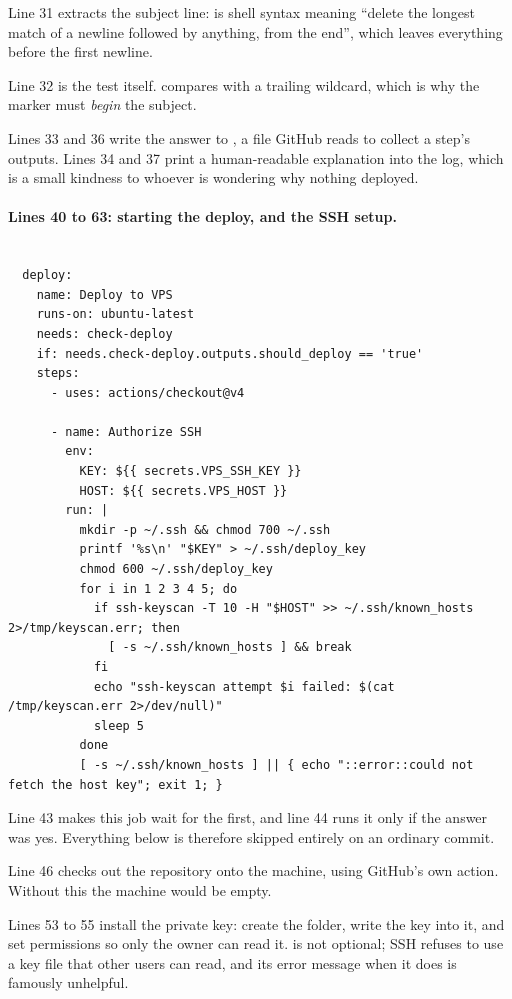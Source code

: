 Line 31 extracts the subject line: 
is shell syntax meaning ``delete the longest match of a newline followed by anything,
from the end'', which leaves everything before the first newline.

Line 32 is the test itself.  compares with a
trailing wildcard, which is why the marker must \emph{begin} the subject.

Lines 33 and 36 write the answer to , a file GitHub reads to
collect a step's outputs. Lines 34 and 37 print a human-readable explanation into
the log, which is a small kindness to whoever is wondering why nothing deployed.

\paragraph{Lines 40 to 63: starting the deploy, and the SSH setup.}

\begin{lstlisting}[firstnumber=39,caption={\file{deploy.yml.disabled}, lines 39--63}]

  deploy:
    name: Deploy to VPS
    runs-on: ubuntu-latest
    needs: check-deploy
    if: needs.check-deploy.outputs.should_deploy == 'true'
    steps:
      - uses: actions/checkout@v4

      - name: Authorize SSH
        env:
          KEY: ${{ secrets.VPS_SSH_KEY }}
          HOST: ${{ secrets.VPS_HOST }}
        run: |
          mkdir -p ~/.ssh && chmod 700 ~/.ssh
          printf '%s\n' "$KEY" > ~/.ssh/deploy_key
          chmod 600 ~/.ssh/deploy_key
          for i in 1 2 3 4 5; do
            if ssh-keyscan -T 10 -H "$HOST" >> ~/.ssh/known_hosts 2>/tmp/keyscan.err; then
              [ -s ~/.ssh/known_hosts ] && break
            fi
            echo "ssh-keyscan attempt $i failed: $(cat /tmp/keyscan.err 2>/dev/null)"
            sleep 5
          done
          [ -s ~/.ssh/known_hosts ] || { echo "::error::could not fetch the host key"; exit 1; }
\end{lstlisting}

Line 43 makes this job wait for the first, and line 44 runs it only if the answer
was yes. Everything below is therefore skipped entirely on an ordinary commit.

Line 46 checks out the repository onto the machine, using GitHub's own action.
Without this the machine would be empty.

Lines 53 to 55 install the private key: create the  folder,
write the key into it, and set permissions so only the owner can read it.
 is not optional; SSH refuses to use a key file that other users
can read, and its error message when it does is famously unhelpful.

